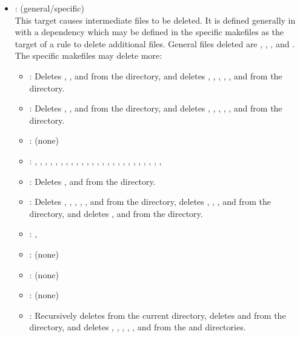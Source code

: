 \begin{itemize}
\item
    : (general/specific)
   \\ This target causes intermediate files to be deleted.  It is defined
   generally in  with a dependency which may be defined in the
   specific makefiles as the target of a rule to delete additional files.
   General files deleted are \file{*~}, \file{*\%}, ,
   and .  The specific makefiles may delete more:
   \begin{itemize}
   \item
      : Deletes \file{*~}, \file{*\%}, and 
      from the  directory, and deletes ,
      , , , , and 
      from the  directory.
   \item
      : Deletes \file{*~}, \file{*\%}, and 
      from the  directory, and deletes ,
      , , , , and 
      from the  directory.
   \item
      : (none)
   \item
      : , , , ,
      , , , , ,
      , , , , ,
      , , , , ,
      , , , , ,
      , 
   \item
      : Deletes  , and  from the
       directory.
   \item
      : Deletes , , ,
      , , and  from the 
      directory, deletes \file{*~}, \file{*\%}, , and 
      from the  directory, and deletes \file{*~},
      \file{*\%} and  from the 
      directory.
   \item
      : , 
   \item
      : (none)
   \item
      : (none)
   \item
      : (none)
   \item
      : Recursively deletes  from the current
      directory, deletes \file{*~} and  from the
       directory, and deletes , ,
      , , , and  from the
       and  directories.
   \end{itemize}


\end{itemize}
